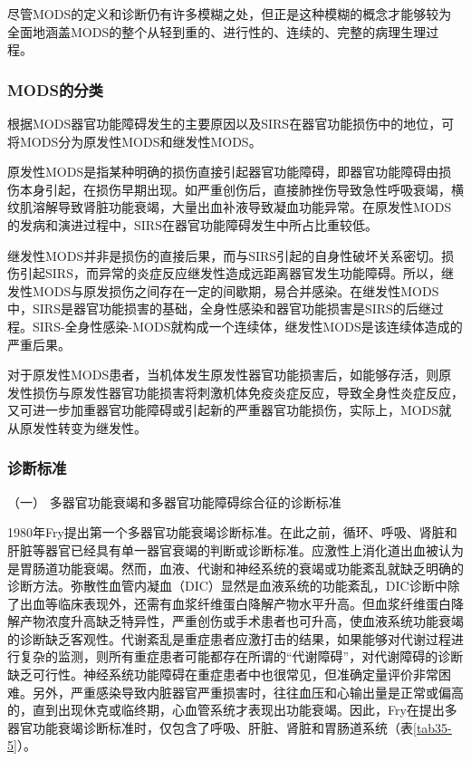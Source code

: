 尽管MODS的定义和诊断仍有许多模糊之处，但正是这种模糊的概念才能够较为全面地涵盖MODS的整个从轻到重的、进行性的、连续的、完整的病理生理过程。

\subsubsection{MODS的分类}

根据MODS器官功能障碍发生的主要原因以及SIRS在器官功能损伤中的地位，可将MODS分为原发性MODS和继发性MODS。

原发性MODS是指某种明确的损伤直接引起器官功能障碍，即器官功能障碍由损伤本身引起，在损伤早期出现。如严重创伤后，直接肺挫伤导致急性呼吸衰竭，横纹肌溶解导致肾脏功能衰竭，大量出血补液导致凝血功能异常。在原发性MODS的发病和演进过程中，SIRS在器官功能障碍发生中所占比重较低。

继发性MODS并非是损伤的直接后果，而与SIRS引起的自身性破坏关系密切。损伤引起SIRS，而异常的炎症反应继发性造成远距离器官发生功能障碍。所以，继发性MODS与原发损伤之间存在一定的间歇期，易合并感染。在继发性MODS中，SIRS是器官功能损害的基础，全身性感染和器官功能损害是SIRS的后继过程。SIRS-全身性感染-MODS就构成一个连续体，继发性MODS是该连续体造成的严重后果。

对于原发性MODS患者，当机体发生原发性器官功能损害后，如能够存活，则原发性损伤与原发性器官功能损害将刺激机体免疫炎症反应，导致全身性炎症反应，又可进一步加重器官功能障碍或引起新的严重器官功能损伤，实际上，MODS就从原发性转变为继发性。

\subsubsection{诊断标准}

\hypertarget{text00094.htmlux5cux23CHP3-11-3-3-1}{}
（一） 多器官功能衰竭和多器官功能障碍综合征的诊断标准

1980年Fry提出第一个多器官功能衰竭诊断标准。在此之前，循环、呼吸、肾脏和肝脏等器官已经具有单一器官衰竭的判断或诊断标准。应激性上消化道出血被认为是胃肠道功能衰竭。然而，血液、代谢和神经系统的衰竭或功能紊乱就缺乏明确的诊断方法。弥散性血管内凝血（DIC）显然是血液系统的功能紊乱，DIC诊断中除了出血等临床表现外，还需有血浆纤维蛋白降解产物水平升高。但血浆纤维蛋白降解产物浓度升高缺乏特异性，严重创伤或手术患者也可升高，使血液系统功能衰竭的诊断缺乏客观性。代谢紊乱是重症患者应激打击的结果，如果能够对代谢过程进行复杂的监测，则所有重症患者可能都存在所谓的“代谢障碍”，对代谢障碍的诊断缺乏可行性。神经系统功能障碍在重症患者中也很常见，但准确定量评价非常困难。另外，严重感染导致内脏器官严重损害时，往往血压和心输出量是正常或偏高的，直到出现休克或临终期，心血管系统才表现出功能衰竭。因此，Fry在提出多器官功能衰竭诊断标准时，仅包含了呼吸、肝脏、肾脏和胃肠道系统（表\ref{tab35-5}）。

